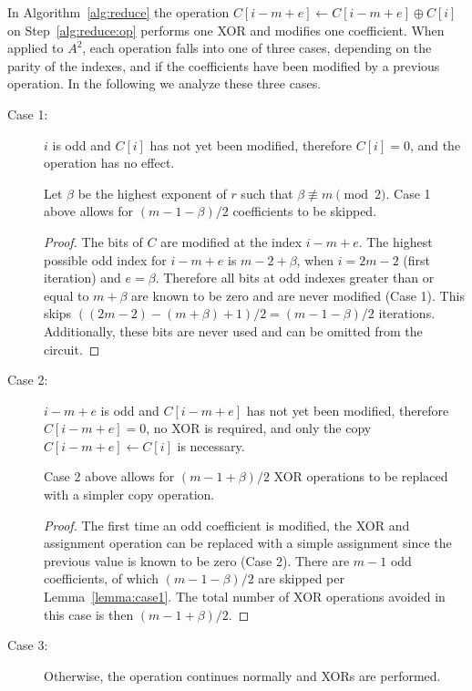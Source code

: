 In Algorithm~\ref{alg:reduce} the operation $C[i-m+e] \leftarrow C[i-m+e] \oplus C[i]$ on Step~\ref{alg:reduce:op} performs one XOR and modifies one coefficient. When applied to $A^2$, each operation falls into one of three cases, depending on the parity of the indexes, and if the coefficients have been modified by a previous operation. In the following we analyze these three cases. \\

\begin{description}
\item[Case 1:] $i$ is odd and $C[i]$ has not yet been modified, therefore $C[i]=0$, and the operation has no effect.
    
\begin{lem} \label{lemma:case1}
Let $\beta$ be the highest exponent of $r$ such that $\beta \not\equiv m \pmod {2}$. Case 1 above allows for $(m-1-\beta) / 2$ coefficients to be skipped.
\end{lem}

\begin{proof}
The bits of $C$ are modified at the index $i-m+e$. The highest possible odd index for $i-m+e$ is $m-2+\beta$, when $i=2m-2$ (first iteration) and $e = \beta$. Therefore all bits at odd indexes greater than or equal to $m+\beta$ are known to be zero and are never modified (Case 1). This skips $\left((2m-2) - (m+\beta) + 1\right)/2 = (m-1-\beta)/2$ iterations. Additionally, these bits are never used and can be omitted from the circuit.
\end{proof}

\item[Case 2:] $i-m+e$ is odd and $C[i-m+e]$ has not yet been modified, therefore $C[i-m+e]=0$, no XOR is required, and only the copy $C[i-m+e] \leftarrow C[i]$ is necessary.
    \begin{lem} \label{lemma:case2}
Case 2 above allows for $(m-1+\beta)/2$ XOR operations to be replaced with a simpler copy operation.
\end{lem}

\begin{proof}
The first time an odd coefficient is modified, the XOR and assignment operation can be replaced with a simple assignment since the previous value is known to be zero (Case 2). There are $m-1$ odd coefficients, of which $(m-1-\beta)/2$ are skipped per Lemma~\ref{lemma:case1}. The total number of XOR operations avoided in this case is then $(m-1+\beta)/2$.
\end{proof}

\item[Case 3:] Otherwise, the operation continues normally and XORs are performed.
\end{description}

